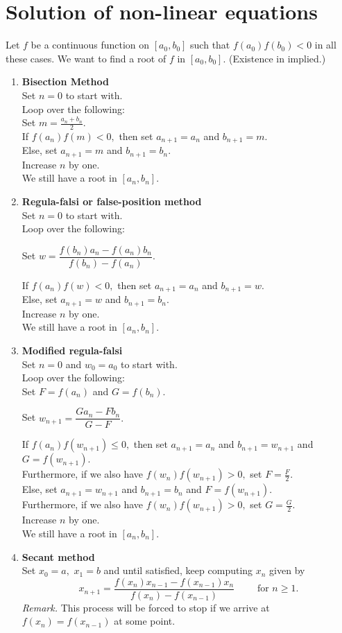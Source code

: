 \documentclass[12pt]{article}
\theoremstyle{definition}
\begin{document}
\section{Solution of non-linear equations}
Let $f$ be a continuous function on $[a_0, b_0]$ such that $f(a_0)f(b_0) < 0$ in all these cases. We want to find a root of $f$ in $[a_0, b_0].$ (Existence in implied.)
\begin{enumerate} 
	\itemsep1em
	\item \textbf{Bisection Method}\\
	Set $n = 0$ to start with.\\
	Loop over the following:\\
	Set $m = \frac{a_n + b_n}{2}.$\\
	If $f(a_n)f(m) < 0,$ then set $a_{n+1} = a_n$ and $b_{n+1} = m.$\\
	Else, set $a_{n+1} = m$ and $b_{n+1} = b_n.$\\
	Increase $n$ by one.\\
	We still have a root in $[a_n, b_n].$
	\item \textbf{Regula-falsi or false-position method}\\
	Set $n = 0$ to start with.\\
	Loop over the following:

	Set $w = \dfrac{f(b_n)a_n - f(a_n)b_n}{f(b_n) - f(a_n)}.$

	If $f(a_n)f(w) < 0,$ then set $a_{n+1} = a_n$ and $b_{n+1} = w.$\\
	Else, set $a_{n+1} = w$ and $b_{n+1} = b_n.$\\
	Increase $n$ by one.\\
	We still have a root in $[a_n, b_n].$
	\item \textbf{Modified regula-falsi}\\
	Set $n = 0$ and $w_0 = a_0$ to start with.\\
	Loop over the following:\\
	Set $F = f(a_n)$ and $G = f(b_n).$

	Set $w_{n+1} = \dfrac{Ga_n -Fb_n}{G - F}.$

	If $f(a_n)f(w_{n+1}) \le 0,$ then set $a_{n+1} = a_n$ and $b_{n+1} = w_{n+1}$ and $G =f(w_{n+1}).$\\
	Furthermore, if we also have $f(w_{n})f(w_{n+1}) > 0,$ set $F = \frac{F}{2}.$\\
	Else, set $a_{n+1} = w_{n+1}$ and $b_{n+1} = b_n$ and $F = f(w_{n+1}).$\\
	Furthermore, if we also have $f(w_{n})f(w_{n+1}) > 0,$ set $G = \frac{G}{2}.$\\
	Increase $n$ by one.\\
	We still have a root in $[a_n, b_n].$	
	\item \textbf{Secant method}\\
	Set $x_0 = a,$ $x_1 = b$ and until satisfied, keep computing $x_n$ given by
	\[x_{n+1} = \frac{f(x_n)x_{n-1} - f(x_{n-1})x_n}{f(x_n) - f(x_{n-1})} \qquad \text{ for } n \ge 1.\]
	\emph{Remark.} This process will be forced to stop if we arrive at $f(x_n) = f(x_{n-1})$ at some point.
\end{enumerate}
\end{document}
